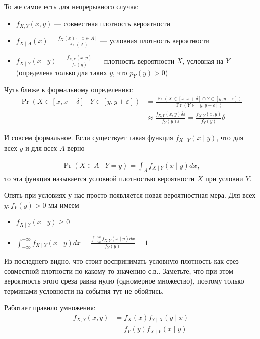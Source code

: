 \documentclass[12pt]{article}
\newcommand\eps{\varepsilon}
\begin{document}
То же самое есть для непрерывного случая:
\begin{itemize}
  \item $f_{X, Y}(x, y)$ --- совместная плотность вероятности
  \item $f_{X \mid A}(x) = \frac{f_X(x)\cdot [x \in A]}{\Pr(A)}$ --- условная плотность вероятности
  \item $f_{X \mid Y}(x \mid y) = \frac{f_{X, Y}(x, y)}{f_Y(y)}$ --- плотность вероятности $X$, условная на $Y$ (определена только для таких $y$, что $p_Y(y) > 0$)
\end{itemize}

Чуть ближе к формальному определению: 
\begin{align*}
  \Pr\left(X \in [x, x + \delta] \mid Y \in [y, y + \eps]\right) &= \frac{\Pr\left(X \in [x, x + \delta] \cap Y \in [y, y + \eps]\right)}{\Pr(Y \in [y, y + \eps])} \\
  &\approx \frac{f_{X, Y}(x, y) \delta \eps}{f_Y(y) \eps} = \frac{f_{X, Y}(x, y)}{f_Y(y)} \delta
\end{align*}

И совсем формальное. Если существует такая функция $f_{X \mid Y}(x \mid y)$, что для всех $y$ и для всех $A$ верно

\begin{align*}
  \Pr(X \in A \mid Y = y) = \int_A f_{X \mid Y}(x \mid y) dx,
\end{align*}
то эта функция называется условной плотностью вероятности $X$ при условии $Y$.

Опять при условиях у нас просто появляется новая вероятностная мера. Для всех $y: f_Y(y) > 0$ мы имеем
\begin{itemize}
  \item $f_{X \mid Y}(x \mid y) \ge 0$
  \item $\int_{-\infty}^{+\infty} f_{X \mid Y}(x \mid y) dx = \frac{\int_{-\infty}^{+\infty} f_{X, Y}(x \mid y) dx}{f_Y(y)} = 1$
\end{itemize}

Из последнего видно, что стоит воспринимать условную плотность как срез совместной плотности по какому-то значению с.в.. Заметьте, что при этом вероятность этого среза равна нулю (одномерное множество), поэтому только терминами условности на события тут не обойтись.

Работает правило умножения:
\begin{align*}
  f_{X, Y} (x, y) &= f_X(x) f_{Y \mid X}(y \mid x) \\
                  &= f_Y(y) f_{X \mid Y}(x \mid y) \\
\end{align*}
\end{document}
